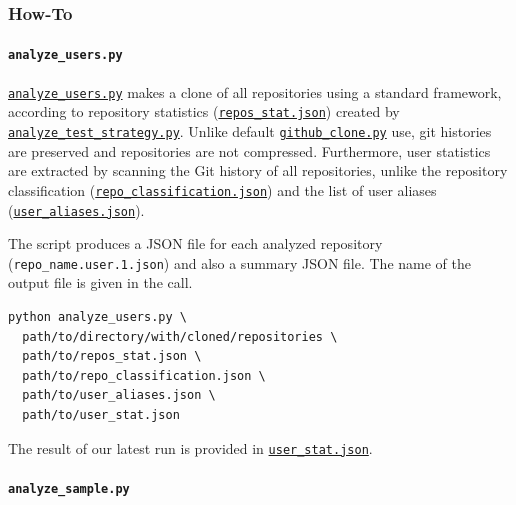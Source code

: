 \documentclass[]{article}
\let\oldparagraph\paragraph
\renewcommand{\paragraph}[1]{\oldparagraph{#1}\mbox{}}
\begin{document}
\hypertarget{users-howto}{%
\subsubsection{How-To}\label{users-howto}}

\hypertarget{analyze-users}{%
\paragraph{\texorpdfstring{\texttt{analyze\_users.py}}{analyze\_users.py}}\label{analyze-users}}

\href{https://github.com/LarsAsplund/github-facts/tree/main/py/analyze_users.py}{\texttt{analyze\_users.py}} makes a clone of all repositories using a standard framework, according to repository statistics (\href{https://github.com/LarsAsplund/github-facts/tree/main/repos_stat.json}{\texttt{repos\_stat.json}}) created by \href{https://github.com/LarsAsplund/github-facts/tree/main/py/analyze_test_strategy.py}{\texttt{analyze\_test\_strategy.py}}. Unlike default \href{https://github.com/LarsAsplund/github-facts/tree/main/py/github_clone.py}{\texttt{github\_clone.py}} use, git histories are preserved and repositories are not compressed. Furthermore, user statistics are extracted by scanning the Git history of all repositories, unlike the repository classification (\href{https://github.com/LarsAsplund/github-facts/tree/main/repo_classification.json}{\texttt{repo\_classification.json}}) and the list of user aliases (\href{https://github.com/LarsAsplund/github-facts/tree/main/user_aliases.json}{\texttt{user\_aliases.json}}).

The script produces a JSON file for each analyzed repository (\texttt{repo\_name.user.1.json}) and also a summary JSON file. The name of the output file is given in the call.

\begin{verbatim}
python analyze_users.py \
  path/to/directory/with/cloned/repositories \
  path/to/repos_stat.json \
  path/to/repo_classification.json \
  path/to/user_aliases.json \
  path/to/user_stat.json
\end{verbatim}

The result of our latest run is provided in \href{https://github.com/LarsAsplund/github-facts/tree/main/user_stat.json}{\texttt{user\_stat.json}}.

\hypertarget{analyze_sample}{%
\paragraph{\texorpdfstring{\texttt{analyze\_sample.py}}{analyze\_sample.py}}\label{analyze_sample}}
\end{document}

